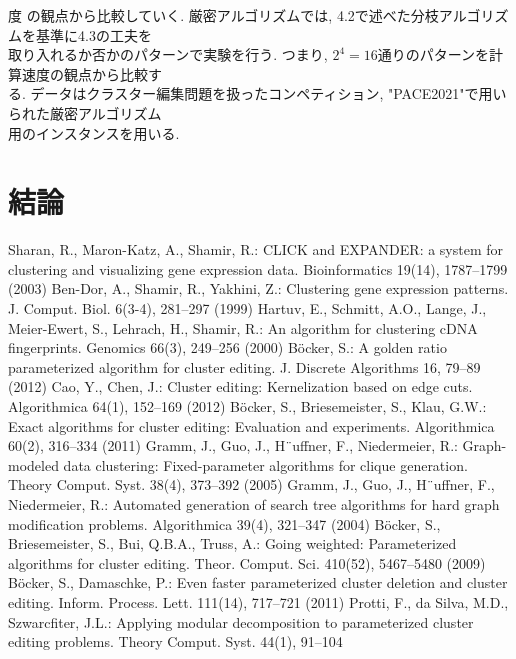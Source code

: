 \documentclass[10.5,a4paper,titlepage]{bxjsarticle}
\begin{document}
度
の観点から比較していく.
厳密アルゴリズムでは, 4.2で述べた分枝アルゴリズムを基準に4.3の工夫を\\

取り入れるか否かのパターンで実験を行う. つまり, $2^4=16$通りのパターンを計算速度の観点から比較す\\

る.
データはクラスター編集問題を扱ったコンペティション, "PACE2021"で用いられた厳密アルゴリズム\\

用のインスタンスを用いる.
\section{結論}
\begin{thebibliography}{}
    \bibitem{} Sharan, R., Maron-Katz, A., Shamir, R.: CLICK and EXPANDER: a system for
    clustering and visualizing gene expression data. Bioinformatics 19(14), 1787–1799
    (2003)
    \bibitem{} Ben-Dor, A., Shamir, R., Yakhini, Z.: Clustering gene expression patterns. J.
    Comput. Biol. 6(3-4), 281–297 (1999)
    \bibitem{} Hartuv, E., Schmitt, A.O., Lange, J., Meier-Ewert, S., Lehrach, H., Shamir, R.:
    An algorithm for clustering cDNA fingerprints. Genomics 66(3), 249–256 (2000)
    \bibitem{} Böcker, S.: A golden ratio parameterized algorithm for cluster editing. J. Discrete
    Algorithms 16, 79–89 (2012)
    \bibitem{}  Cao, Y., Chen, J.: Cluster editing: Kernelization based on edge cuts. Algorithmica
    64(1), 152–169 (2012)
    \bibitem{}  Böcker, S., Briesemeister, S., Klau, G.W.: Exact algorithms for cluster editing:
    Evaluation and experiments. Algorithmica 60(2), 316–334 (2011)
    \bibitem{} Gramm, J., Guo, J., H¨uffner, F., Niedermeier, R.: Graph-modeled data clustering:
    Fixed-parameter algorithms for clique generation. Theory Comput. Syst. 38(4),
    373–392 (2005)
    \bibitem{} Gramm, J., Guo, J., H¨uffner, F., Niedermeier, R.: Automated generation of search
    tree algorithms for hard graph modification problems. Algorithmica 39(4), 321–347
    (2004)
    \bibitem{} Böcker, S., Briesemeister, S., Bui, Q.B.A., Truss, A.: Going weighted: Parameterized algorithms for cluster editing. Theor. Comput. Sci. 410(52), 5467–5480 (2009)
    \bibitem{} Böcker, S., Damaschke, P.: Even faster parameterized cluster deletion and cluster
    editing. Inform. Process. Lett. 111(14), 717–721 (2011)
    \bibitem{} Protti, F., da Silva, M.D., Szwarcfiter, J.L.: Applying modular decomposition
    to parameterized cluster editing problems. Theory Comput. Syst. 44(1), 91–104

\end{thebibliography}
\end{document}
